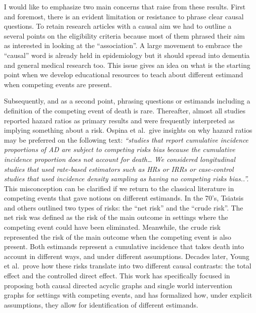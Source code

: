 \documentclass[
]{book}
\begin{document}
I would like to emphasize two main concerns that raise from these results. First and foremost, there is an evident limitation or resistance to phrase clear causal questions. To retain research articles with a causal aim we had to outline a several points on the eligibility criteria because most of them phrased their aim as interested in looking at the ``association''. A large movement to embrace the ``causal'' word is already held in epidemiology\autocite{hernan_cword2018,hernan2019,goetghebeur2020,olarte2021} but it should spread into dementia and general medical research too. This issue gives an idea on what is the starting point when we develop educational resources to teach about different estimand when competing events are present.

Subsequently, and as a second point, phrasing questions or estimands including a definition of the competing event of death is rare. Thereafter, almost all studies reported hazard ratios as primary results and were frequently interpreted as implying something about a risk. Ospina et al.~give insights on why hazard ratios may be preferred on the following text: \emph{``studies that report cumulative incidence proportions of AD are subject to competing risks bias because the cumulative incidence proportion does not account for death\ldots{} We considered longitudinal studies that used rate-based estimators such as HRs or IRRs or case-control studies that used incidence density sampling as having no competing risks bias..''.} This misconception can be clarified if we return to the classical literature in competing events that gave notions on different estimands. In the 70's, Tsiatsis and others outlined two types of risks: the ``net risk'' and the ``crude risk''\autocite{tsiatis1975,peterson1976}. The net risk was defined as the risk of the main outcome in settings where the competing event could have been eliminated. Meanwhile, the crude risk represented the risk of the main outcome when the competing event is also present. Both estimands represent a cumulative incidence that takes death into account in different ways, and under different assumptions. Decades later, Young et al.~prove how these risks translate into two different causal contrasts: the total effect and the controlled direct effect\autocite{young2020}. This work has specifically focused in proposing both causal directed acyclic graphs and single world intervention graphs for settings with competing events, and has formalized how, under explicit assumptions, they allow for identification of different estimands.
\end{document}
